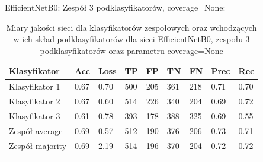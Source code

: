 \documentclass[polish,12pt]{aghthesis}
\begin{document}
\vspace{3mm}
\par\noindent EfficientNetB0:
\vspace{3mm}
\newline\noindent Zespół 3 podklasyfikatorów, coverage=None:
\renewcommand{\arraystretch}{1.75}
 \begin{longtable}[h!]{|m{2.6cm}|m{1.2cm}|m{1.2cm}|m{1.2cm}|m{1.2cm}|m{1.2cm}|m{1.2cm}|m{1.2cm}|m{1.2cm}|}
 \hline
 Klasyfikator & Acc & Loss & TP & FP & TN & FN & Prec & Rec\\
 \hline
 Klasyfikator 1 & 0.67 & 0.70 & 500 & 205 & 361 & 218 & 0.71 & 0.70\\
 \hline
 Klasyfikator 2 & 0.67 & 0.60 & 514 & 226 & 340 & 204 & 0.69 & 0.72\\
 \hline
 Klasyfikator 3 & 0.61 & 0.78 & 393 & 178 & 388 & 325 & 0.69 & 0.55\\
 \hline
 Zespół average & 0.69 & 0.57 & 512 & 190 & 376 & 206 & 0.73 & 0.71\\ 
 \hline
 Zespół \newline majority & 0.69 & 2.19 & 514 & 196 & 370 & 204 & 0.72 & 0.72\\
 \hline
\caption{Miary jakości sieci dla klasyfikatorów zespołowych oraz wchodzących w ich skład podklasyfikatorów dla sieci EfficientNetB0, zespołu 3 podklasyfikatorów oraz parametru coverage=None}
\label{table:29}
\end{longtable}
\end{document}
